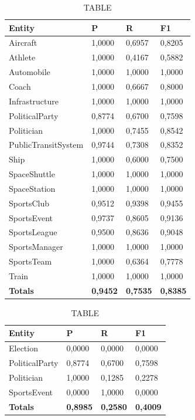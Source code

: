 \documentclass[thesis=M,english]{FITthesis}[2018/05/30]
\begin{document}
\begin{table}[H]\centering
		\caption{TABLE}
		\label{}
		\begin{tabular}{|l|l|l|l|}
			\hline {\textbf{Entity}} & {\textbf{P}} & {\textbf{R}} & {\textbf{F1}}\\\hline
				Aircraft & 1,0000 & 0,6957 & 0,8205\\
				Athlete & 1,0000 & 0,4167 & 0,5882\\
				Automobile & 1,0000 & 1,0000 & 1,0000\\ 
				Coach & 1,0000 & 0,6667 & 0,8000\\
				Infrastructure & 1,0000 & 1,0000 & 1,0000\\
				PoliticalParty & 0,8774 & 0,6700 & 0,7598\\
				Politician & 1,0000 & 0,7455 & 0,8542\\
				PublicTransitSystem & 0,9744 & 0,7308 & 0,8352\\
				Ship & 1,0000 & 0,6000 & 0,7500\\
				SpaceShuttle & 1,0000 & 1,0000 & 1,0000\\
				SpaceStation & 1,0000 & 1,0000 & 1,0000\\ 
				SportsClub & 0,9512 & 0,9398 & 0,9455\\
				SportsEvent & 0,9737 & 0,8605 & 0,9136\\
				SportsLeague & 0,9500 & 0,8636 & 0,9048\\
				SportsManager & 1,0000 & 1,0000 & 1,0000\\
				SportsTeam & 1,0000 & 0,6364 & 0,7778\\
				Train & 1,0000 & 1,0000 & 1,0000\\\hline
				\textbf{Totals} & \textbf{0,9452} & \textbf{0,7535} & \textbf{0,8385}\\\hline
		\end{tabular}
	\end{table}

	\begin{table}[H]\centering
		\caption{TABLE}
		\label{}
		\begin{tabular}{|l|l|l|l|}
			\hline {\textbf{Entity}} & {\textbf{P}} & {\textbf{R}} & {\textbf{F1}}\\\hline
				Election & 0,0000 & 0,0000 & 0,0000\\
				PoliticalParty & 0,8774 & 0,6700 & 0,7598\\
				Politician & 1,0000 & 0,1285 & 0,2278\\
				SportsEvent & 0,0000 & 1,0000 & 0,0000\\\hline
				\textbf{Totals} & \textbf{0,8985} & \textbf{0,2580} & \textbf{0,4009}\\\hline
		\end{tabular}
	\end{table}	
\end{document}
